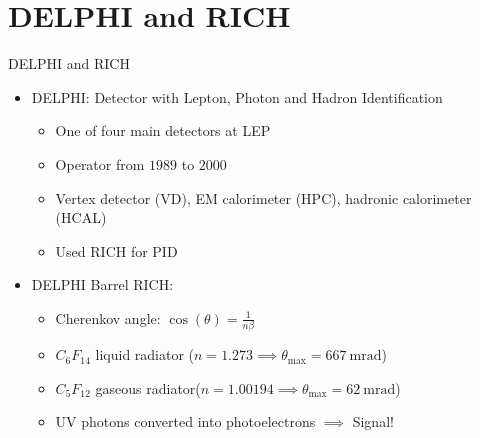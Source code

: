 \documentclass{beamer}
\begin{document}
\section{DELPHI and RICH}
\begin{frame}{DELPHI and RICH}
  \begin{itemize}
    \item{DELPHI: Detector with Lepton, Photon and Hadron Identification}
    \begin{itemize}
      \item{One of four main detectors at LEP}
      \item{Operator from $1989$ to $2000$}
      \item{Vertex detector (VD), EM calorimeter (HPC), hadronic calorimeter (HCAL)}
      \item{Used RICH for PID}
    \end{itemize}
    \item{DELPHI Barrel RICH:}
    \begin{itemize}
      \item{Cherenkov angle: $\cos(\theta) = \frac{1}{n\beta}$}
      \item{$C_6F_{14}$ liquid radiator ($n = 1.273 \implies \theta_\text{max} = \SI{667}{\milli\radian}$)}
      \item{$C_5F_{12}$ gaseous radiator($n = 1.00194 \implies \theta_\text{max} = \SI{62}{\milli\radian}$)}
      \item{UV photons converted into photoelectrons $\implies$ Signal!}
    \end{itemize}
  \end{itemize}
\end{frame}
\end{document}
